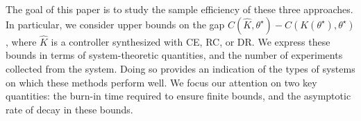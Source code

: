 The goal of this paper is to study the sample efficiency of these three approaches. In particular, we consider upper bounds on the gap $C(\hat K, \theta^\star)- C(K(\theta^\star), \theta^\star)$, where $\hat K$ is a controller synthesized with CE, RC, or DR. We express these bounds in terms of system-theoretic quantities, and the number of experiments collected from the system. Doing so provides an indication of the types of systems on which these methods perform well. We focus our attention on two key quantities: the burn-in time required to ensure finite bounds, and the asymptotic rate of decay in these bounds. 


